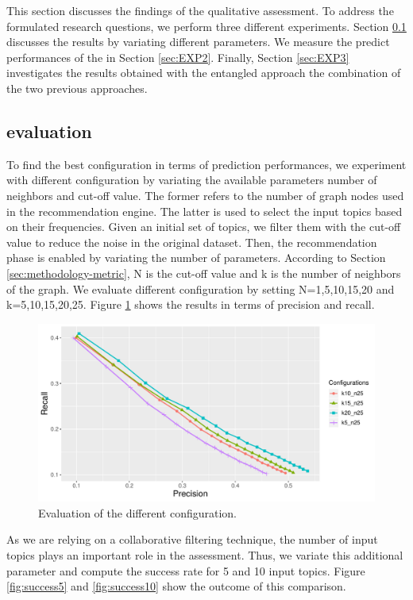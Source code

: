 This section discusses the findings of the qualitative assessment. To address the formulated research questions, we perform three different experiments. Section \ref{sec:EXP1} discusses the \CT results by variating different parameters.  We measure the predict performances of the \MNB in Section \ref{sec:EXP2}. Finally, Section \ref{sec:EXP3} investigates the results obtained with the entangled approach \ie the combination of the two previous approaches. 


\subsection{\CT evaluation} \label{sec:EXP1}
 \rqfirst
To find the best configuration in terms of prediction performances, we experiment with different \CT configuration by variating the available parameters \ie number of neighbors and cut-off value.  The former refers to the number of graph nodes used in the recommendation engine. The latter is used to select the input topics based on their frequencies. Given an initial set of topics, we filter them with the cut-off value to reduce the noise in the original dataset. Then, the recommendation phase is enabled by variating the number of parameters. According to Section \ref{sec:methodology-metric}, N is the cut-off value and k is the number of neighbors of the graph. We evaluate different configuration by setting N=1,5,10,15,20 and k=5,10,15,20,25. Figure \ref{fig:configs} shows the results  in terms of precision and recall. 


\begin{figure}[t!]
	\centering
	\includegraphics[width=\linewidth]{figs/PrecisionRecallCurve.pdf}
	\caption{Evaluation of the different configuration.}
	\label{fig:configs}
\end{figure}


As we are relying on a collaborative filtering technique, the number of input topics plays an important role in the assessment. Thus, we variate this additional parameter and compute the success rate for 5 and 10 input topics. Figure \ref{fig:success5} and \ref{fig:success10} show the outcome of this comparison.  

